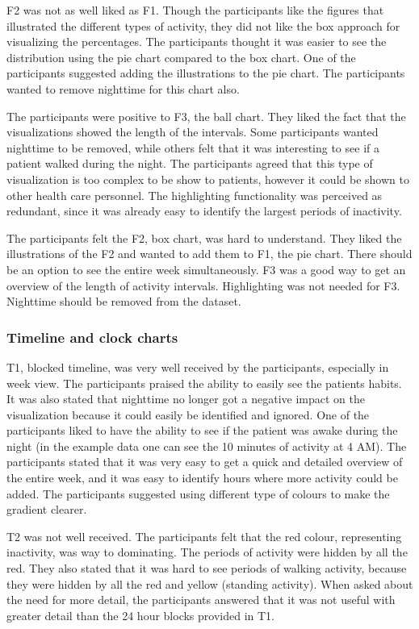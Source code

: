 F2 was not as well liked as F1. Though the participants like the figures that illustrated the different types of activity, they did not like the box approach for visualizing the percentages. The participants thought it was easier to see the distribution using the pie chart compared to the box chart. One of the participants suggested adding the illustrations to the pie chart. The participants wanted to remove nighttime for this chart also.

The participants were positive to F3, the ball chart. They liked the fact that the visualizations showed the length of the intervals. Some participants wanted nighttime to be removed, while others felt that it was interesting to see if a patient walked during the night. The participants agreed that this type of visualization is too complex to be show to patients, however it could be shown to other health care personnel. The highlighting functionality was perceived as redundant, since it was already easy to identify the largest periods of inactivity.

The participants felt the F2, box chart, was hard to understand. They liked the illustrations of the F2 and wanted to add them to F1, the pie chart. There should be an option to see the entire week simultaneously. F3 was a good way to get an overview of the length of activity intervals. Highlighting was not needed for F3. Nighttime should be removed from the dataset.

\subsubsection{Timeline and clock charts}
T1, blocked timeline, was very well received by the participants, especially in week view. The participants praised the ability to easily see the patients habits. It was also stated that nighttime no longer got a negative impact on the visualization because it could easily be identified and ignored. One of the participants liked to have the ability to see if the patient was awake during the night (in the example data one can see the 10 minutes of activity at 4 AM). The participants stated that it was very easy to get a quick and detailed overview of the entire week, and it was easy to identify hours where more activity could be added. The participants suggested using different type of colours to make the gradient clearer.

T2 was not well received. The participants felt that the red colour, representing inactivity, was way to dominating. The periods of activity were hidden by all the red. They also stated that it was hard to see periods of walking activity, because they were hidden by all the red and yellow (standing activity). When asked about the need for more detail, the participants answered that it was not useful with greater detail than the 24 hour blocks provided in T1.

